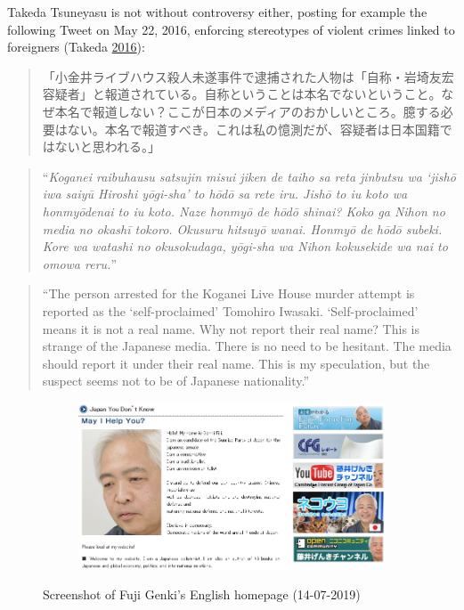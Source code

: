 \documentclass[10pt,british,A4paper,,openany]{memoir}
\begin{document}
Takeda Tsuneyasu is not without controversy either, posting for example
the following Tweet on May 22, 2016, enforcing stereotypes of violent
crimes linked to foreigners (Takeda
\protect\hyperlink{ref-takeda_eng._2016}{2016}):

\begin{quote}
「小金井ライブハウス殺人未遂事件で逮捕された人物は「自称・岩埼友宏容疑者」と報道されている。自称ということは本名でないということ。なぜ本名で報道しない？ここが日本のメディアのおかしいところ。臆する必要はない。本名で報道すべき。これは私の憶測だが、容疑者は日本国籍ではないと思われる。」
\end{quote}

\begin{quote}
``\emph{Koganei raibuhausu satsujin misui jiken de taiho sa reta
jinbutsu wa `jishō iwa saiyū Hiroshi yōgi-sha' to hōdō sa rete iru.
Jishō to iu koto wa honmyōdenai to iu koto. Naze honmyō de hōdō shinai?
Koko ga Nihon no media no okashī tokoro. Okusuru hitsuyō wanai. Honmyō
de hōdō subeki. Kore wa watashi no okusokudaga, yōgi-sha wa Nihon
kokusekide wa nai to omowa reru.}''
\end{quote}

\begin{quote}
``The person arrested for the Koganei Live House murder attempt is
reported as the `self-proclaimed' Tomohiro Iwasaki. `Self-proclaimed'
means it is not a real name. Why not report their real name? This is
strange of the Japanese media. There is no need to be hesitant. The
media should report it under their real name. This is my speculation,
but the suspect seems not to be of Japanese nationality.''
\end{quote}

\begin{figure}[!htb]
 \centering
 \begin{subfigure}[b]{0.75\textwidth}
  \includegraphics[width=\textwidth]{images/genkifuji.jpg}
 \end{subfigure}
 \caption{Screenshot of Fuji Genki's English homepage (14-07-2019)}\label{fig:genkifuji}
\end{figure}
\end{document}
